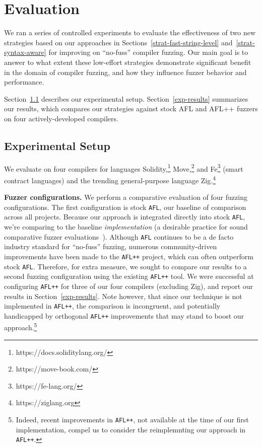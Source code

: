 \section{Evaluation}
\label{eval}

We ran a series of controlled experiments to evaluate the effectiveness of two
new strategies based on our approaches in Sections~\ref{strat-fast-string-level}
and~\ref{strat-syntax-aware} for improving on ``no-fuss'' compiler fuzzing. Our
main goal is to answer to what extent these low-effort strategies demonstrate
significant benefit in the domain of compiler fuzzing, and how they influence
fuzzer behavior and performance.

Section~\ref{exp-setup} describes our experimental setup.
Section~\ref{exp-results} summarizes our results, which compares our strategies
against stock AFL and AFL++ fuzzers on four actively-developed compilers. 

\subsection{Experimental Setup}
\label{exp-setup}

We evaluate on four compilers for languages Solidity,\footnote{https://docs.soliditylang.org/}
Move,\footnote{https://move-book.com/} and Fe\footnote{https://fe-lang.org/} (smart contract languages)
and the trending general-purpose language Zig.\footnote{https://ziglang.org}

\noindent \textbf{Fuzzer configurations.} We perform a comparative evaluation
of four fuzzing configurations.  The first configuration is stock \texttt{AFL},
our baseline of comparison across all projects. Because our approach is
integrated directly into stock \texttt{AFL}, we're comparing to the baseline
\emph{implementation} (a desirable practice for sound comparative fuzzer
evaluations~\cite{BoehmeCR21}).
Although \texttt{AFL} continues to be a de facto industry standard for
``no-fuss'' fuzzing, numerous community-driven improvements have been made to
the \texttt{AFL++} project, which can often outperform stock \texttt{AFL}.
Therefore, for extra measure, we sought to compare our results to a second
fuzzing configuration using the existing \texttt{AFL++} tool. We were
successful at configuring \texttt{AFL++} for three of our four compilers
(excluding Zig), and report our results in Section~\ref{exp-results}.  Note
however, that since our technique is not implemented in \texttt{AFL++}, the
comparison is incongruent, and potentially handicapped by orthogonal
\texttt{AFL++} improvements that may stand to boost our
approach.\footnote{Indeed, recent improvements in \texttt{AFL++}, not available
at the time of our first implementation, compel us to consider the
reimplemnting our approach in \texttt{AFL++}.}

